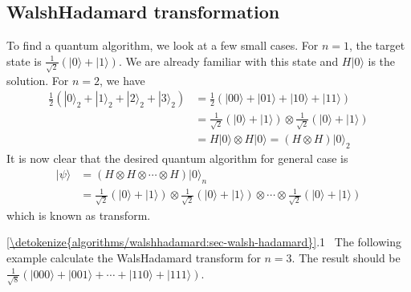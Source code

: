 \documentclass[letterpaper,10pt,english]{jupyterBook}
\begin{document}
\subsection{Walsh\sphinxhyphen{}Hadamard transformation}
\label{\detokenize{algorithms/walshhadamard:id1}}
\sphinxAtStartPar
To find a quantum algorithm, we look at a few small cases. For \(n=1\), the target state is \(\frac{1}{\sqrt{2}}\left(|0\rangle + |1\rangle\right)\).  We are already familiar with this state and \(H|0\rangle\) is the solution.  For \(n=2\), we have
\begin{align}
\frac{1}{2}\left(|0\rangle_2 + |1\rangle_2 + |2\rangle_2 + |3\rangle_2 \right) &=
\frac{1}{2}\left(|00\rangle + |01\rangle + |10\rangle + |11\rangle\right) \\
& = \frac{1}{\sqrt{2}}\left(|0\rangle + |1\rangle\right) \otimes \frac{1}{\sqrt{2}}\left(|0\rangle + |1\rangle\right) \\
& = H|0\rangle \otimes H|0\rangle = (H\otimes H) |0\rangle_2
\end{align}
\sphinxAtStartPar
It is now clear that the desired quantum algorithm for general case is
\begin{align}
|\psi\rangle &= (H \otimes H \otimes \cdots \otimes H) |0\rangle_n \\
& = \frac{1}{\sqrt{2}}\left(|0\rangle + |1\rangle\right) \otimes \frac{1}{\sqrt{2}}\left(|0\rangle + |1\rangle\right) \otimes \cdots \otimes \frac{1}{\sqrt{2}}\left(|0\rangle + |1\rangle\right)\label{equation:algorithms/walshhadamard:walsh-hadamard}
\end{align}
\sphinxAtStartPar
which is known as  transform.

\sphinxAtStartPar
{} \hyperref[\detokenize{algorithms/walshhadamard:sec-walsh-hadamard}]{\ref{\detokenize{algorithms/walshhadamard:sec-walsh-hadamard}}}.1   The following example calculate the Wals\sphinxhyphen{}Hadamard transform for \(n=3\).  The result should be \(\frac{1}{\sqrt{8}} \left(|000\rangle + |001\rangle + \cdots + |110\rangle + |111\rangle \right)\).
\end{document}
